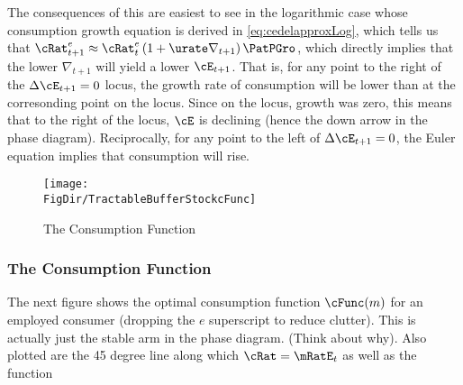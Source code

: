\documentclass{\handout}
\begin{document}
The consequences of this are easiest to see in the logarithmic case whose consumption growth equation is derived in \eqref{eq:cedelapproxLog}, which tells us that ${\cRat}^{e}_{t+1} \approx {\cRat}^{e}_{t}\left(1+ \urate \nabla _{t+1}\right) {\PatPGro}$, which directly 
implies that the lower $\nabla_{t+1}$ will yield a lower $\cE_{t+1}$.  That is, for any point to the right of the $\Delta \cE_{t+1}=0$ locus, the growth rate of consumption will be lower than at the corresonding point on the locus.  Since on the locus, growth
was zero, this means that to the right of the locus, $\cE$ is declining (hence the down arrow in the phase diagram).  Reciprocally, for any point to the left of $\Delta \cE_{t+1}=0$, the Euler equation implies that consumption will rise.

\begin{figure}
\caption{The Consumption Function}\label{fig:cFunc}
\texttt{[image: \\FigDir/TractableBufferStockcFunc]}
\end{figure}

\subsubsection{The Consumption Function}
The next figure shows the optimal consumption function $\cFunc(m)$ for an
employed consumer (dropping the $e$ superscript to reduce clutter).  This
is actually just the stable arm in the phase diagram.  (Think about
why).  Also plotted are the 45 degree line along which $\cRat = \mRatE_{t}$
as well as the function
\end{document}
